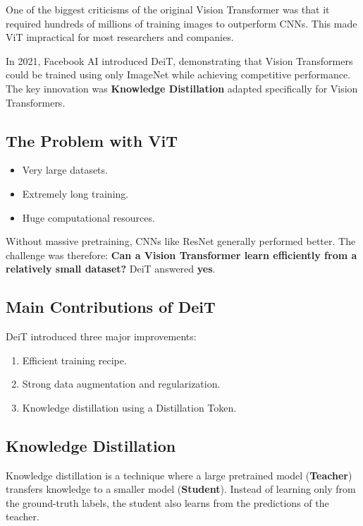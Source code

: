 One of the biggest criticisms of the original Vision Transformer was that it required hundreds of millions of training images to outperform CNNs. This made ViT impractical for most researchers and companies.

In 2021, Facebook AI introduced DeiT, demonstrating that Vision Transformers could be trained using only ImageNet while achieving competitive performance. The key innovation was \textbf{Knowledge Distillation} adapted specifically for Vision Transformers.

\subsection{The Problem with ViT}
\begin{itemize}
    \item Very large datasets.
    \item Extremely long training.
    \item Huge computational resources.
\end{itemize}

Without massive pretraining, CNNs like ResNet generally performed better. The challenge was therefore: \textbf{Can a Vision Transformer learn efficiently from a relatively small dataset?} DeiT answered \textbf{yes}.

\subsection{Main Contributions of DeiT}

DeiT introduced three major improvements:
\begin{enumerate}
    \item Efficient training recipe.
    \item Strong data augmentation and regularization.
    \item Knowledge distillation using a Distillation Token.
\end{enumerate}

\subsection{Knowledge Distillation}

Knowledge distillation is a technique where a large pretrained model (\textbf{Teacher}) transfers knowledge to a smaller model (\textbf{Student}). Instead of learning only from the ground-truth labels, the student also learns from the predictions of the teacher.

